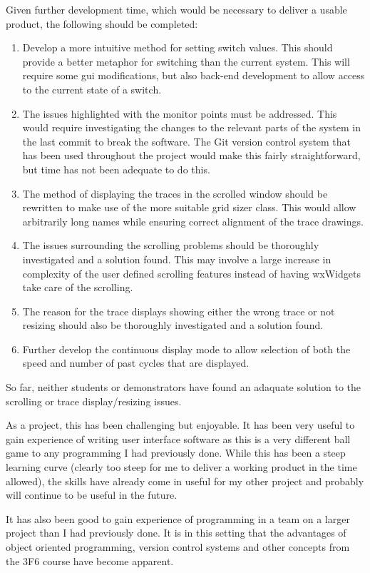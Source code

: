 \documentclass[a4paper,10pt]{article}  %
\begin{document}
Given further development time, which would be necessary to deliver a
usable product, the following should be completed:
\begin{enumerate}
\item Develop a more intuitive method for setting switch values. This
  should provide a better metaphor for switching than the current
  system. This will require some gui modifications, but also back-end
  development to allow access to the current state of a switch.
\item The issues highlighted with the monitor points must be
  addressed. This would require investigating the changes to the
  relevant parts of the system in the last commit to break the
  software. The Git version control system that has been used
  throughout the project would make this fairly straightforward, but
  time has not been adequate to do this.
\item The method of displaying the traces in the scrolled window
  should be rewritten to make use of the more suitable grid sizer
  class. This would allow arbitrarily long names while ensuring
  correct alignment of the trace drawings.
\item The issues surrounding the scrolling problems should be
  thoroughly investigated and a solution found. This may involve a
  large increase in complexity of the user defined scrolling features
  instead of having wxWidgets take care of the scrolling.
\item The reason for the trace displays showing either the wrong trace
  or not resizing should also be thoroughly investigated and a
  solution found.
\item Further develop the continuous display mode to allow selection
  of both the speed and number of past cycles that are displayed.
\end{enumerate}
So far, neither students or demonstrators have found an adaquate
solution to the scrolling or trace display/resizing issues.

As a project, this has been challenging but enjoyable. It has been
very useful to gain experience of writing user interface software as
this is a very different ball game to any programming I had previously
done. While this has been a steep learning curve (clearly too steep
for me to deliver a working product in the time allowed), the skills
have already come in useful for my other project and probably will
continue to be useful in the future.

It has also been good to gain experience of programming in a team on a
larger project than I had previously done. It is in this setting that
the advantages of object oriented programming, version control systems
and other concepts from the 3F6 course have become apparent.
\end{document}
